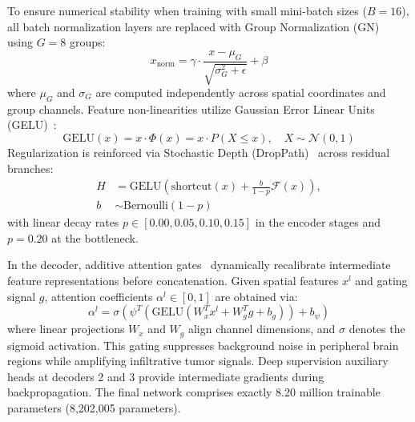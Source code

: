 \documentclass[preprint,3p,times,onecolumn]{elsarticle}
\begin{document}
To ensure numerical stability when training with small mini-batch sizes ($B=16$), all batch normalization layers are replaced with Group Normalization (GN)~\cite{wu2018group} using $G=8$ groups:
\begin{equation}
x_{\text{norm}} = \gamma \cdot \frac{x - \mu_{G}}{\sqrt{\sigma_{G}^2 + \epsilon}} + \beta
\end{equation}
where $\mu_{G}$ and $\sigma_{G}$ are computed independently across spatial coordinates and group channels. Feature non-linearities utilize Gaussian Error Linear Units (GELU)~\cite{hendrycks2016gaussian}:
\begin{equation}
\text{GELU}(x) = x \cdot \Phi(x) = x \cdot P(X \le x), \quad X \sim \mathcal{N}(0, 1)
\end{equation}
Regularization is reinforced via Stochastic Depth (DropPath)~\cite{huang2016deep} across residual branches:
\begin{equation}
\begin{aligned}
H &= \text{GELU}\left(\text{shortcut}(x) + \frac{b}{1-p}\mathcal{F}(x)\right), \\
b &\sim \text{Bernoulli}(1-p)
\end{aligned}
\end{equation}
with linear decay rates $p \in [0.00, 0.05, 0.10, 0.15]$ in the encoder stages and $p=0.20$ at the bottleneck.

In the decoder, additive attention gates~\cite{oktay2018attention} dynamically recalibrate intermediate feature representations before concatenation. Given spatial features $x^l$ and gating signal $g$, attention coefficients $\alpha^l \in [0, 1]$ are obtained via:
\begin{equation}
\alpha^l = \sigma\left(\psi^T \left(\text{GELU}\left(W_x^T x^l + W_g^T g + b_g\right)\right) + b_\psi\right)
\end{equation}
where linear projections $W_x$ and $W_g$ align channel dimensions, and $\sigma$ denotes the sigmoid activation. This gating suppresses background noise in peripheral brain regions while amplifying infiltrative tumor signals. Deep supervision auxiliary heads at decoders 2 and 3 provide intermediate gradients during backpropagation. The final network comprises exactly 8.20 million trainable parameters (8,202,005 parameters).
\end{document}
